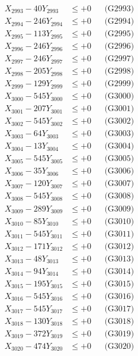 \documentclass[a4paper,10pt]{article}
\begin{document}
{\begin{align}
X_{2993} - 40Y_{2993} &\leq +0 && \text{(G2993)} \\
X_{2994} - 246Y_{2994} &\leq +0 && \text{(G2994)} \\
X_{2995} - 113Y_{2995} &\leq +0 && \text{(G2995)} \\
X_{2996} - 246Y_{2996} &\leq +0 && \text{(G2996)} \\
X_{2997} - 246Y_{2997} &\leq +0 && \text{(G2997)} \\
X_{2998} - 205Y_{2998} &\leq +0 && \text{(G2998)} \\
X_{2999} - 129Y_{2999} &\leq +0 && \text{(G2999)} \\
X_{3000} - 545Y_{3000} &\leq +0 && \text{(G3000)} \\
\allowbreak
X_{3001} - 207Y_{3001} &\leq +0 && \text{(G3001)} \\
X_{3002} - 545Y_{3002} &\leq +0 && \text{(G3002)} \\
X_{3003} - 64Y_{3003} &\leq +0 && \text{(G3003)} \\
X_{3004} - 13Y_{3004} &\leq +0 && \text{(G3004)} \\
X_{3005} - 545Y_{3005} &\leq +0 && \text{(G3005)} \\
X_{3006} - 35Y_{3006} &\leq +0 && \text{(G3006)} \\
X_{3007} - 120Y_{3007} &\leq +0 && \text{(G3007)} \\
X_{3008} - 545Y_{3008} &\leq +0 && \text{(G3008)} \\
X_{3009} - 289Y_{3009} &\leq +0 && \text{(G3009)} \\
X_{3010} - 85Y_{3010} &\leq +0 && \text{(G3010)} \\
\allowbreak
X_{3011} - 545Y_{3011} &\leq +0 && \text{(G3011)} \\
X_{3012} - 171Y_{3012} &\leq +0 && \text{(G3012)} \\
X_{3013} - 48Y_{3013} &\leq +0 && \text{(G3013)} \\
X_{3014} - 94Y_{3014} &\leq +0 && \text{(G3014)} \\
X_{3015} - 195Y_{3015} &\leq +0 && \text{(G3015)} \\
X_{3016} - 545Y_{3016} &\leq +0 && \text{(G3016)} \\
X_{3017} - 545Y_{3017} &\leq +0 && \text{(G3017)} \\
X_{3018} - 130Y_{3018} &\leq +0 && \text{(G3018)} \\
X_{3019} - 372Y_{3019} &\leq +0 && \text{(G3019)} \\
X_{3020} - 474Y_{3020} &\leq +0 && \text{(G3020)} \\

\end{align}}
\end{document}
